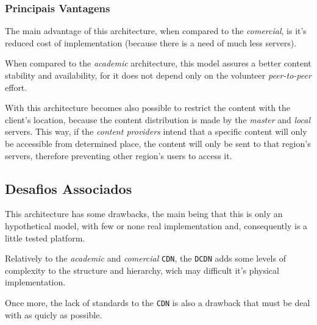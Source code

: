 \documentclass{article}
\begin{document}
\subsubsection{Principais Vantagens}

The main advantage of this architecture, when compared to the \emph{comercial},
is it's reduced cost of implementation (because there is a need 
of much less servers).

When compared to the \emph{academic} architecture, this model assures a
better content stability and availability, for it does not depend 
only on the volunteer \emph{peer-to-peer} effort. 

With this architecture becomes also possible to restrict the content
with the client's location, because the content distribution is made
by the \emph{master} and \emph{local} servers. This way, if the 
\emph{content providers} intend that a specific content will only be
accessible from determined place, the content will only be sent to
that region's servers, therefore preventing other region's users
to access it.


\subsection{Desafios Associados}

This architecture has some drawbacks, the main being that this is
only an hypothetical model, with few or none real implementation
and, consequently is a little tested platform.

Relatively to the \emph{academic} and \emph{comercial} \texttt{CDN},
the \texttt{DCDN} adds some levels of complexity to the structure and
hierarchy, wich may difficult it's physical implementation.

Once more, the lack of standards to the \texttt{CDN} is also
a drawback that must be deal with as quicly as possible.
\end{document}
